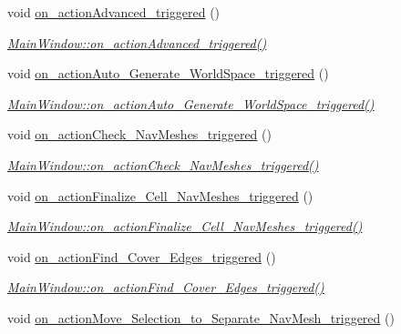 \begin{DoxyCompactItemize}
void \hyperlink{class_main_window_a5aa2fcd339d653b805dd629bc5ada6ea}{on\+\_\+action\+Advanced\+\_\+triggered} ()
\begin{DoxyCompactList}\small\item\em \hyperlink{class_main_window_a5aa2fcd339d653b805dd629bc5ada6ea}{Main\+Window\+::on\+\_\+action\+Advanced\+\_\+triggered()} \end{DoxyCompactList}\item 
void \hyperlink{class_main_window_a967d58b1c44e2c438b3d1387852856f1}{on\+\_\+action\+Auto\+\_\+\+Generate\+\_\+\+World\+Space\+\_\+triggered} ()
\begin{DoxyCompactList}\small\item\em \hyperlink{class_main_window_a967d58b1c44e2c438b3d1387852856f1}{Main\+Window\+::on\+\_\+action\+Auto\+\_\+\+Generate\+\_\+\+World\+Space\+\_\+triggered()} \end{DoxyCompactList}\item 
void \hyperlink{class_main_window_a7b839044120c99de319e916b3804423d}{on\+\_\+action\+Check\+\_\+\+Nav\+Meshes\+\_\+triggered} ()
\begin{DoxyCompactList}\small\item\em \hyperlink{class_main_window_a7b839044120c99de319e916b3804423d}{Main\+Window\+::on\+\_\+action\+Check\+\_\+\+Nav\+Meshes\+\_\+triggered()} \end{DoxyCompactList}\item 
void \hyperlink{class_main_window_ac6952d7d9fe31aa25e570b898eb5257d}{on\+\_\+action\+Finalize\+\_\+\+Cell\+\_\+\+Nav\+Meshes\+\_\+triggered} ()
\begin{DoxyCompactList}\small\item\em \hyperlink{class_main_window_ac6952d7d9fe31aa25e570b898eb5257d}{Main\+Window\+::on\+\_\+action\+Finalize\+\_\+\+Cell\+\_\+\+Nav\+Meshes\+\_\+triggered()} \end{DoxyCompactList}\item 
void \hyperlink{class_main_window_a23fdbcb0c33b6f6327cffa6d2debf1ed}{on\+\_\+action\+Find\+\_\+\+Cover\+\_\+\+Edges\+\_\+triggered} ()
\begin{DoxyCompactList}\small\item\em \hyperlink{class_main_window_a23fdbcb0c33b6f6327cffa6d2debf1ed}{Main\+Window\+::on\+\_\+action\+Find\+\_\+\+Cover\+\_\+\+Edges\+\_\+triggered()} \end{DoxyCompactList}\item 
void \hyperlink{class_main_window_a22f2240480e250819d2fbbaf2a6cf13b}{on\+\_\+action\+Move\+\_\+\+Selection\+\_\+to\+\_\+\+Separate\+\_\+\+Nav\+Mesh\+\_\+triggered} ()

\end{DoxyCompactItemize}
